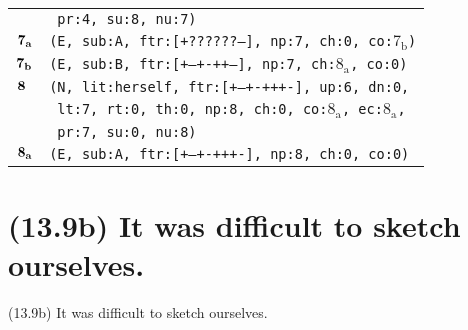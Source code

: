 \documentclass{article}
\begin{document}
\begin{minipage}{\textwidth}
{\begin{tabular}{|r|l|}
    & \texttt{\texttt{~pr:4,~su:8,~nu:7)}} \\
    ${\textbf{\textrm{7}}_{\textbf{\textrm{a}}}}$ & \texttt{\texttt{(E,~sub:A,~ftr:[+??????--],~np:7,~ch:0,~co:${\textrm{7}_{\textrm{b}}}$)}} \\
    ${\textbf{\textrm{7}}_{\textbf{\textrm{b}}}}$ & \texttt{\texttt{(E,~sub:B,~ftr:[+--+-++--],~np:7,~ch:${\textrm{8}_{\textrm{a}}}$,~co:0)}} \\
    ${\textbf{\textrm{8}}_{\phantom{z}}}$ & \texttt{\texttt{(N,~lit:herself,~ftr:[+--+-+++-],~up:6,~dn:0,}} \\
    & \texttt{\texttt{~lt:7,~rt:0,~th:0,~np:8,~ch:0,~co:${\textrm{8}_{\textrm{a}}}$,~ec:${\textrm{8}_{\textrm{a}}}$,}} \\
    & \texttt{\texttt{~pr:7,~su:0,~nu:8)}} \\
    ${\textbf{\textrm{8}}_{\textbf{\textrm{a}}}}$ & \texttt{\texttt{(E,~sub:A,~ftr:[+--+-+++-],~np:8,~ch:0,~co:0)}} \\
    \hline
  \end{tabular}
  }
\end{minipage}
\bigbreak

\clearpage

%
%

\section*{(13.9b) It was difficult to sketch ourselves.}

\bigbreak
\begin{enumerate*}
\item[(13.9b)] It was difficult to sketch ourselves.
\end{enumerate*}
\bigbreak
\end{document}
